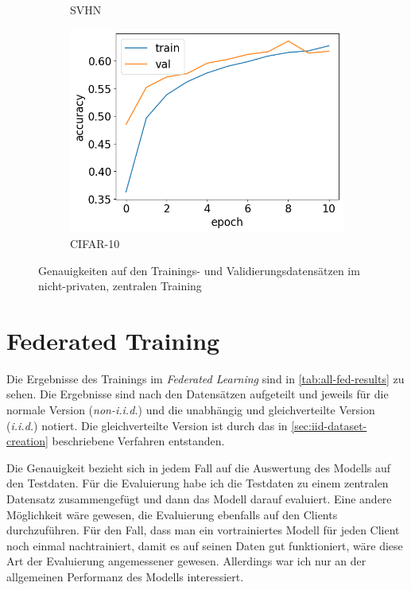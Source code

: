 \begin{figure}
\begin{subfigure}{0.32\textwidth}
		\caption{SVHN}
	\end{subfigure}
	\begin{subfigure}{0.32\textwidth}
		\centering
		\includegraphics[width=\textwidth]{Bilder/cifar-results-local.png}
		\caption{CIFAR-10}
	\end{subfigure}
	\caption{Genauigkeiten auf den Trainings- und Validierungsdatensätzen im nicht-privaten, zentralen Training}
	\label{fig:local-training-histories}
\end{figure}

\section{Federated Training}\label{sec:fl-training-results}

Die Ergebnisse des Trainings im \textit{Federated Learning} sind in \autoref{tab:all-fed-results} zu sehen. Die Ergebnisse sind nach den Datensätzen aufgeteilt und jeweils für die normale Version (\textit{non-i.i.d.}) und die unabhängig und gleichverteilte Version (\textit{i.i.d.}) notiert. Die gleichverteilte Version ist durch das in \autoref{sec:iid-dataset-creation} beschriebene Verfahren entstanden.

Die Genauigkeit bezieht sich in jedem Fall auf die Auswertung des Modells auf den Testdaten. Für die Evaluierung habe ich die Testdaten zu einem zentralen Datensatz zusammengefügt und dann das Modell darauf evaluiert. Eine andere Möglichkeit wäre gewesen, die Evaluierung ebenfalls auf den Clients durchzuführen. Für den Fall, dass man ein vortrainiertes Modell für jeden Client noch einmal nachtrainiert, damit es auf seinen Daten gut funktioniert, wäre diese Art der Evaluierung angemessener gewesen. Allerdings war ich nur an der allgemeinen Performanz des Modells interessiert.


